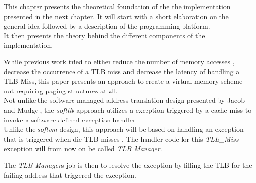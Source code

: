 This chapter presents the theoretical foundation of the the implementation presented in the next chapter.
It will start with a short elaboration on the general idea followed by a description of the
programming platform.\\
It then presents the theory behind the different components of the implementation.






While previous work tried to either reduce the number of memory accesses ,
decrease the occurrence of a TLB miss and decrease the latency of handling a TLB Miss, this paper
presents an approach to create a virtual memory scheme not requiring paging structures at all.\\

Not unlike the software-managed address translation design presented by Jacob and Mudge \cite{jacobSoftwaremanagedAddressTranslation1997},
the \textit{softtlb} approach utilizes a exception triggered by a cache miss to invoke a software-defined
exception handler.\\
Unlike the \textit{softvm} design, this approach will be based on handling an exception that is triggered
when die TLB misses .
The handler code for this \textit{TLB\_Miss} exception will from now on be called \textit{TLB Manager}.

The \textit{TLB Manager}s job is then to resolve the exception by filling the TLB for the failing address
that triggered the exception.


